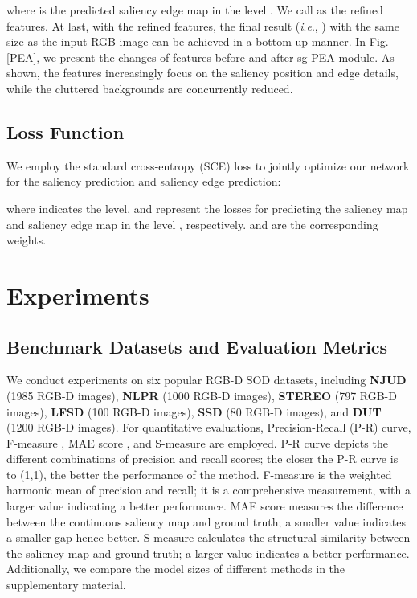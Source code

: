 \documentclass[runningheads]{llncs}
\newcommand{\ie}{\textit{i}.\textit{e}.}
\begin{document}
where  is the predicted saliency edge map in the level . We call  as the refined features. At last, with the refined features, the  final result (\ie, )  with the same size as the input RGB image can be achieved in a bottom-up manner. In Fig. \ref{PEA}, we present the changes of features before and after sg-PEA module. As shown, the features increasingly focus on the saliency position and edge details, while the cluttered backgrounds are concurrently reduced.


\subsection{Loss Function}
We employ the standard cross-entropy (SCE) loss \cite{cross-entropy} to  jointly optimize our network for the saliency prediction and saliency edge prediction:

where  indicates the level,  and  represent the losses for predicting the saliency map and saliency edge map in the level , respectively.  and  are the corresponding weights.




\section{Experiments}\label{er}
\subsection{Benchmark Datasets and Evaluation Metrics}

We conduct experiments on six popular RGB-D SOD datasets, including \textbf{NJUD} \cite{ACSD} (1985 RGB-D images), \textbf{NLPR} \cite{Peng2014} (1000 RGB-D images), \textbf{STEREO} \cite{Niu2012} (797 RGB-D images), \textbf{LFSD} \cite{LFSD} (100 RGB-D images), \textbf{SSD} \cite{SSD} (80 RGB-D images), and \textbf{DUT} \cite{DMRA} (1200 RGB-D images).
For quantitative evaluations, Precision-Recall (P-R) curve,  F-measure \cite{Fmeasure}, MAE score \cite{RERVIEW}, and S-measure \cite{S-measure} are employed. P-R curve depicts the different combinations of precision and recall scores; the closer the P-R curve is to (1,1), the better the performance of the method. F-measure is the weighted harmonic mean of precision and recall; it is a comprehensive measurement, with a larger value indicating a better performance. MAE score measures the difference between the continuous saliency map and ground truth; a smaller value indicates a smaller gap hence better. S-measure  calculates the structural similarity between the saliency map and ground truth; a larger value indicates a better performance. Additionally, we compare the model sizes of different methods in the supplementary material.
\end{document}
